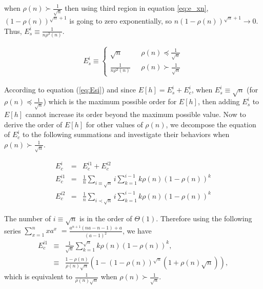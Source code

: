 \documentclass[journal]{IEEEtran}
\theoremstyle{plain}
\theoremstyle{remark}
\begin{document}
\begin{IEEEproof}
when $\rho(n) \succ \frac{1}{\sqrt{n}}$ then using third region in equation \ref{eq:e_xn}, $(1-\rho(n))^{\sqrt{n}+1}$ is going to zero exponentially, so $n(1-\rho(n))^{\sqrt{n}+1}\rightarrow 0$. Thus, $E_s^i \equiv \frac{1}{n\rho^3(n)}$.

\begin{eqnarray}
E_s^i \equiv \left\{\begin{array}{ll}
					\sqrt{n}& \ \ \  \rho(n)\preceq \frac{1}{\sqrt{n}} \\
					\frac{1}{n\rho^3(n)}& \ \ \  \rho(n)\succ \frac{1}{\sqrt{n}}
			\end{array}\right . \label{eq:Esi}
\end{eqnarray}

According to equation (\ref{eq:Esi}) and since $E[h]=E_s^i+E_c^i$, when $E_s^i\equiv \sqrt{n}$ (for $\rho(n)\preceq \frac{1}{\sqrt{n}}$) which is the maximum possible order for $E[h]$, then adding $E_s^i$ to $E[h]$ cannot increase its order beyond the maximum possible value.
Now to derive the order of $E[h]$ for other values of $\rho(n)$, we decompose the equation of $E_c^i$ to the following summations and investigate their behaviors when $\rho(n)\succ \frac{1}{\sqrt{n}}$.

\begin{eqnarray}
E_c^i&=& E_c^{i1}+E_c^{i2} \nonumber \\
E_c^{i1}&=&\frac{1}{n}\sum_{i\equiv \sqrt{n}}i\sum_{k=1}^{i-1}k\rho(n)(1-\rho(n))^k \nonumber \\
E_c^{i2}&=&\frac{1}{n}\sum_{i\prec \sqrt{n}}i\sum_{k=1}^{i-1}k\rho(n)(1-\rho(n))^k 
\end{eqnarray}

The number of $i\equiv \sqrt{n}$ is in the order of $\Theta(1)$. Therefore using the following series $\sum_{x=1}^{n} x a^x$ $= \frac{a^{n+1}(n a - n - 1)+a}{(a-1)^2}$, we have 
\begin{eqnarray}
E_c^{i1}&\equiv& \frac{1}{\sqrt{n}}\sum_{k=1}^{\sqrt{n}}k\rho(n)(1-\rho(n))^k, \nonumber \\
&\equiv& \frac{1-\rho(n)}{\rho(n)\sqrt{n}}(1-(1-\rho(n))^{\sqrt{n}}(1+\rho(n)\sqrt{n})), \nonumber 
\end{eqnarray}
which is equivalent to $\frac{1}{\rho(n)\sqrt{n}}$ when $\rho(n)\succ \frac{1}{\sqrt{n}}$.


\end{IEEEproof}
\end{document}
